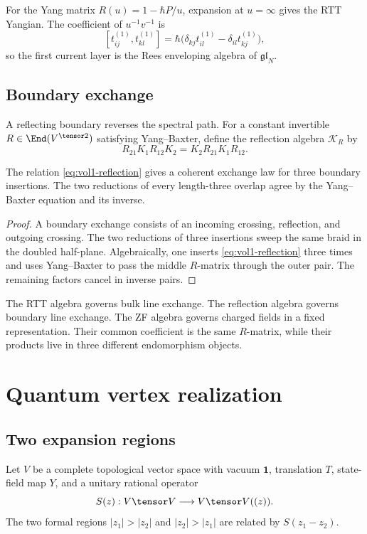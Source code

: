 For the Yang matrix $R(u)=1-\hbar P/u$, expansion at $u=\infty$ gives the RTT Yangian.  The coefficient of $u^{-1}v^{-1}$ is
\[
 [t_{ij}^{(1)},t_{kl}^{(1)}]
 =\hbar\bigl(\delta_{kj}t_{il}^{(1)}-\delta_{il}t_{kj}^{(1)}\bigr),
\]
so the first current layer is the Rees enveloping algebra of $\mathfrak{gl}_N$.

\section{Boundary exchange}
A reflecting boundary reverses the spectral path.  For a constant invertible $R\in\End(V^{\tensor2})$ satisfying Yang--Baxter, define the reflection algebra $\mathcal K_R$ by
\begin{equation}\label{eq:vol1-reflection}
 R_{21}K_1R_{12}K_2
 =K_2R_{21}K_1R_{12}.
\end{equation}

\begin{theorem}
The relation \eqref{eq:vol1-reflection} gives a coherent exchange law for three boundary insertions.  The two reductions of every length-three overlap agree by the Yang--Baxter equation and its inverse.
\end{theorem}
\begin{proof}
A boundary exchange consists of an incoming crossing, reflection, and outgoing crossing.  The two reductions of three insertions sweep the same braid in the doubled half-plane.  Algebraically, one inserts \eqref{eq:vol1-reflection} three times and uses Yang--Baxter to pass the middle $R$-matrix through the outer pair.  The remaining factors cancel in inverse pairs.
\end{proof}

The RTT algebra governs bulk line exchange.  The reflection algebra governs boundary line exchange.  The ZF algebra governs charged fields in a fixed representation.  Their common coefficient is the same $R$-matrix, while their products live in three different endomorphism objects.

\chapter{Quantum vertex realization}
\section{Two expansion regions}
Let $V$ be a complete topological vector space with vacuum $\mathbf1$, translation $T$, state-field map $Y$, and a unitary rational operator
\[
 S(z):V\tensor V\longrightarrow V\tensor V((z)).
\]
The two formal regions $|z_1|>|z_2|$ and $|z_2|>|z_1|$ are related by $S(z_1-z_2)$.

